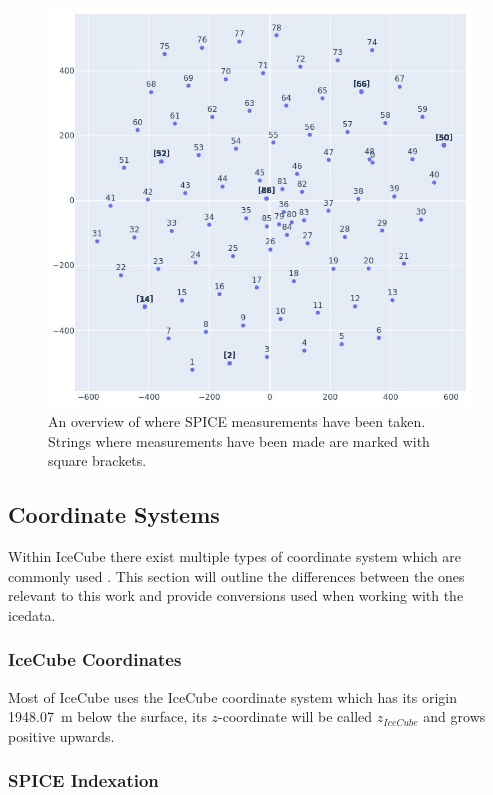 \documentclass[a4paper,10pt]{scrartcl}
\begin{document}
\begin{figure}[h]
    \includegraphics[scale=0.5]{images/string_overview.jpg}
    \centering
    \caption{An overview of where SPICE measurements have been taken. Strings where measurements have been made are marked with square brackets.}
    \label{fig:string_overview}
\end{figure}

\subsection{Coordinate Systems}
\label{coordinates}

Within IceCube there exist multiple types of coordinate system which are commonly used \cite{coordinates-icecube}.
This section will outline the differences between the ones relevant to this work and provide conversions used when working with the icedata.

\subsubsection*{IceCube Coordinates}

Most of IceCube uses the IceCube coordinate system which has its origin \SI{1948.07}{m} below the surface, its $z$-coordinate will be called $z_{IceCube}$ and grows positive upwards.

\subsubsection*{SPICE Indexation}
\end{document}
